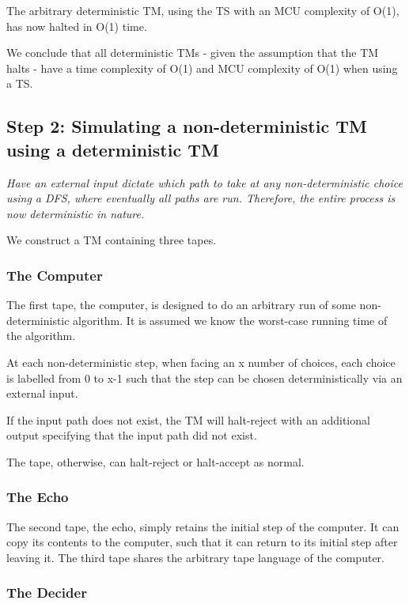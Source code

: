 \documentclass{report}
\begin{document}
The arbitrary deterministic TM, using the TS with an MCU complexity of O(1), has now halted in O(1) time.

We conclude that all deterministic TMs - given the assumption that the TM halts - have a time complexity of O(1) and MCU complexity of O(1) when using a TS.

\subsection{Step 2: Simulating a non-deterministic TM using a deterministic TM}

\textit{Have an external input dictate which path to take at any non-deterministic choice using a DFS, where eventually all paths are run. Therefore, the entire process is now deterministic in nature.}

We construct a TM containing three tapes.

\subsubsection{The Computer}

The first tape, the computer, is designed to do an arbitrary run of some non-deterministic algorithm. It is assumed we know the worst-case running time of the algorithm.

At each non-deterministic step, when facing an x number of choices, each choice is labelled from 0 to x-1 such that the step can be chosen deterministically via an external input. 

If the input path does not exist, the TM will halt-reject with an additional output specifying that the input path did not exist.

The tape, otherwise, can halt-reject or halt-accept as normal.

\subsubsection{The Echo}

The second tape, the echo, simply retains the initial step of the computer. It can copy its contents to the computer, such that it can return to its initial step after leaving it. The third tape shares the arbitrary tape language of the computer.

\subsubsection{The Decider}
\end{document}
